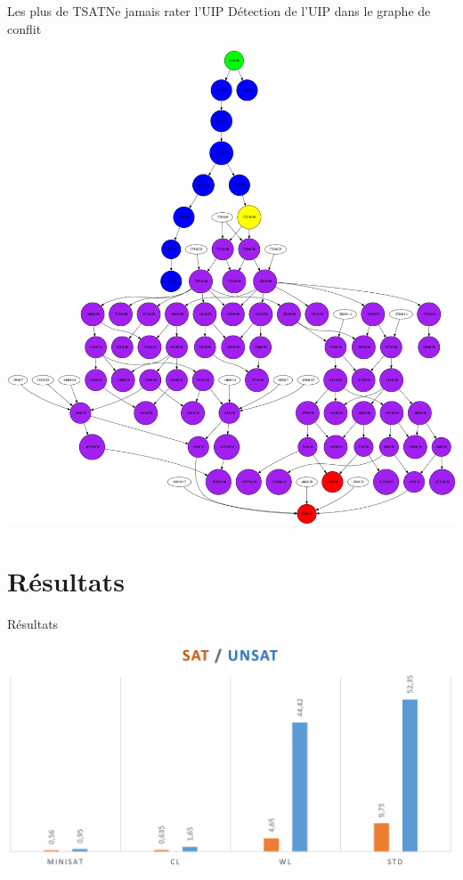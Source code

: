 \documentclass{beamer}
\begin{document}
        \begin{frame}{Les plus de TSAT}{Ne jamais rater l'UIP}
            Détection de l'UIP dans le graphe de conflit 
            \begin{center}
                \includegraphics[scale=0.07]{graphe.png}
            \end{center}
        \end{frame}

    \section{Résultats}
        \begin{frame}{Résultats}{}
            \begin{center}
                \includegraphics[scale=0.25]{time.png}
            \end{center}
        \end{frame}       
\end{document}
